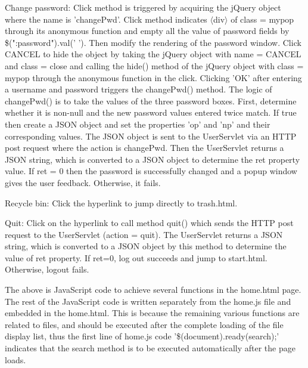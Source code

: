 \documentclass[a4paper,11pt]{article}
\begin{document}
\begin{itemize}
\par Change password: Click method is triggered by acquiring the jQuery object where the name is 'changePwd'. Click method indicates {$\langle$}div{$\rangle$} of class = mypop through its anonymous function and empty all the value of password fields by \$(":password").val(' '). Then modify the rendering of the password window.
Click CANCEL to hide the object by taking the jQuery object with name = CANCEL and class = close and calling the hide() method of the jQuery object with class = mypop through the anonymous function in the click. Clicking 'OK' after entering a username and password triggers the changePwd() method. The logic of changePwd() is to take the values of the three password boxes. First, determine whether it is non-null and the new password values entered twice match. If true then create a JSON object and set the properties 'op' and 'np' and their corresponding values. The JSON object is sent to the UserServlet via an HTTP post request where the action is changePwd. Then the UserServlet returns a JSON string, which is converted to a JSON object to determine the ret property value. If ret = 0 then the password is successfully changed and a popup window gives the user feedback. Otherwise, it fails.

\par Recycle bin: Click the hyperlink to jump directly to trash.html.

\par Quit: Click on the hyperlink to call method quit() which sends the HTTP post request to the UserServlet (action = quit). The UserServlet returns a JSON string, which is converted to a JSON object by this method to determine the value of ret property. If ret=0, log out succeeds and jump to start.html. Otherwise, logout fails.

\par The above is JavaScript code to achieve several functions in the home.html page. The rest of the JavaScript code is written separately from the home.js file and embedded in the home.html. This is because the remaining various functions are related to files, and should be executed after the complete loading of the file display list, thus the first line of home.js code '\$(document).ready(search);' indicates that the search method is to be executed automatically after the page loads.


\end{itemize}
\end{document}
